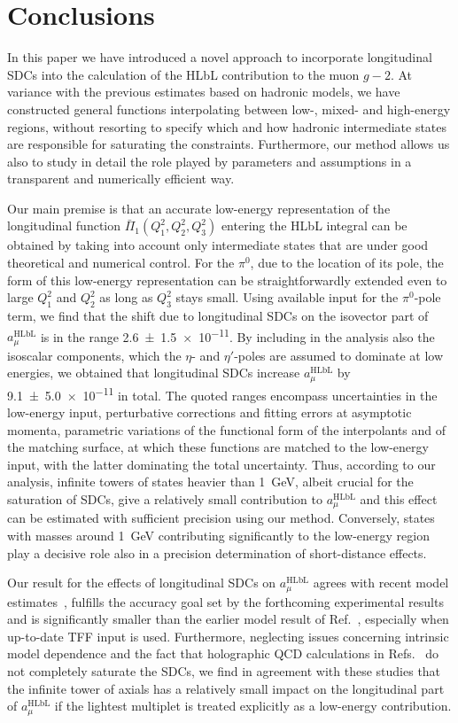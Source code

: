 \section{Conclusions}
\label{Sec:Con}
In this paper we have introduced a novel approach to incorporate longitudinal SDCs into the calculation of the HLbL contribution to the muon $g-2$. At variance with the previous estimates based on hadronic models, we have constructed general functions interpolating between low-, mixed- and high-energy regions, without resorting to specify which and how hadronic intermediate states are responsible for saturating the constraints. Furthermore, our method allows us also to study in detail the role played by parameters and assumptions in a transparent and numerically efficient way.

Our main premise is that an accurate low-energy representation of the longitudinal function $\bar{\Pi}_1(Q_1^2, Q_2^2, Q_3^2)$ entering the HLbL integral can be obtained by taking into account only intermediate states that are under good theoretical and numerical control. For the $\pi^0$, due to the location of its pole, the form of this low-energy representation can be straightforwardly extended even to large $Q_1^2$ and $Q_2^2$ as long as $Q_3^2$ stays small. Using available input for the $\pi^0$-pole term, we find that the shift due to longitudinal SDCs on the isovector part of $a_\mu^\text{HLbL}$ is in the range \num[separate-uncertainty]{2.6\pm1.5e-11}. By including in the analysis also the isoscalar components, which the $\eta$- and $\eta'$-poles are assumed to dominate at low energies, we obtained that longitudinal SDCs increase $a_\mu^\text{HLbL}$ by \num[separate-uncertainty]{9.1\pm5.0e-11} in total. 
The quoted ranges encompass uncertainties in the low-energy input, perturbative corrections and fitting errors at asymptotic momenta, parametric variations of the functional form of the interpolants and of the matching surface, at which these functions are matched to the low-energy input, with the latter dominating the total uncertainty. Thus, according to our analysis, infinite towers of states heavier than \SI{1}{\GeV}, albeit crucial for the saturation of SDCs, give a relatively small contribution to $a_\mu^\text{HLbL}$ and this effect can be estimated with sufficient precision using our method. Conversely, states with masses around \SI{1}{\GeV} contributing significantly to the low-energy region play a decisive role also in a precision determination of short-distance effects.

Our result for the effects of longitudinal SDCs on $a_\mu^\text{HLbL}$ agrees with recent model estimates~\cite{BernSDCShort,BernSDCLong}, fulfills the accuracy goal set by the forthcoming experimental results and is significantly smaller than the earlier model result of Ref.~\cite{MV}, especially when up-to-date TFF input is used. Furthermore, neglecting issues concerning intrinsic model dependence and the fact that holographic QCD calculations in Refs.~\cite{HolographyVienna, HolographyItaly} do not completely saturate the SDCs, we find in agreement with these studies that the infinite tower of axials has a relatively small impact on the longitudinal part of $a_\mu^\text{HLbL}$ if the lightest multiplet is treated explicitly as a low-energy contribution.

